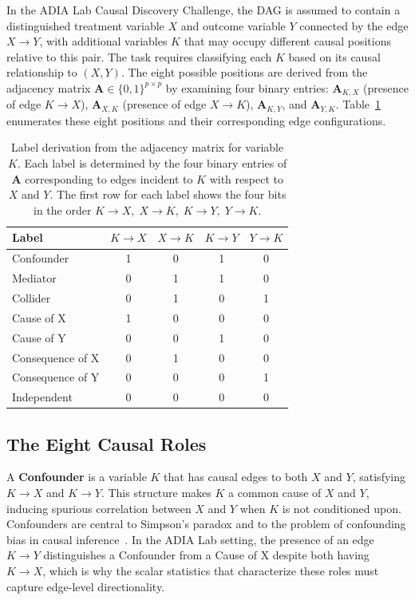 In the ADIA Lab Causal Discovery Challenge, the DAG is assumed to contain a distinguished treatment variable $X$ and outcome variable $Y$ connected by the edge $X\to Y$, with additional variables $K$ that may occupy different causal positions relative to this pair. The task requires classifying each $K$ based on its causal relationship to $(X,Y)$. The eight possible positions are derived from the adjacency matrix $\mathbf{A}\in\{0,1\}^{p\times p}$ by examining four binary entries: $\mathbf{A}_{K,X}$ (presence of edge $K\to X$), $\mathbf{A}_{X,K}$ (presence of edge $X\to K$), $\mathbf{A}_{K,Y}$, and $\mathbf{A}_{Y,K}$. Table~\ref{tab:label_rules} enumerates these eight positions and their corresponding edge configurations.

\begin{table}[ht]
	\centering
	\caption{Label derivation from the adjacency matrix for variable $K$. Each label is determined by the four binary entries of $\mathbf{A}$ corresponding to edges incident to $K$ with respect to $X$ and $Y$. The first row for each label shows the four bits in the order $K\to X,\; X\to K,\; K\to Y,\; Y\to K$.}
	\label{tab:label_rules}
	\begin{tabular}{lcccc}
		\toprule
		\textbf{Label} & $K\to X$ & $X\to K$ & $K\to Y$ & $Y\to K$ \\
		\midrule
		Confounder       & 1 & 0 & 1 & 0 \\
		Mediator         & 0 & 1 & 1 & 0 \\
		Collider         & 0 & 1 & 0 & 1 \\
		Cause of X       & 1 & 0 & 0 & 0 \\
		Cause of Y       & 0 & 0 & 1 & 0 \\
		Consequence of X & 0 & 1 & 0 & 0 \\
		Consequence of Y & 0 & 0 & 0 & 1 \\
		Independent      & 0 & 0 & 0 & 0 \\
		\bottomrule
	\end{tabular}
\end{table}

\subsection{The Eight Causal Roles}
\label{sec:eight_roles}

A \textbf{Confounder} is a variable $K$ that has causal edges to both $X$ and $Y$, satisfying $K\to X$ and $K\to Y$. This structure makes $K$ a common cause of $X$ and $Y$, inducing spurious correlation between $X$ and $Y$ when $K$ is not conditioned upon. Confounders are central to Simpson's paradox and to the problem of confounding bias in causal inference~\cite{pearl2009causality}. In the ADIA Lab setting, the presence of an edge $K\to Y$ distinguishes a Confounder from a Cause of X despite both having $K\to X$, which is why the scalar statistics that characterize these roles must capture edge-level directionality.

